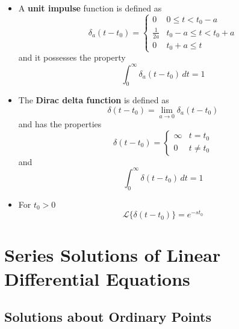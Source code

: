\documentclass{article}
\begin{document}
\begin{itemize}
  \item A \textbf{unit impulse} function is defined as \[\delta_a(t - t_0) = \begin{cases}
            0             & 0 \le t < t_0 - a       \\
            \frac{1}{2 a} & t_0 - a \le t < t_0 + a \\
            0             & t_0 + a \le t
          \end{cases}\] and it possesses the property \[\int_0^\infty \delta_a(t - t_0) \,dt = 1\]

  \item The \textbf{Dirac delta function} is defined as \[\delta(t - t_0) = \lim_{a \rightarrow 0} \delta_a(t - t_0)\] and has the properties \[\delta(t - t_0) = \begin{cases}
            \infty & t = t_0   \\
            0      & t \ne t_0
          \end{cases}\] and \[\int_0^\infty \delta(t - t_0) \,dt = 1\]

  \item For $t_0 > 0$ \[\mathcal{L}\{\delta(t - t_0)\} = e^{-s t_0}\]
\end{itemize}

\section{Series Solutions of Linear Differential Equations}

\subsection{Solutions about Ordinary Points}
\end{document}
